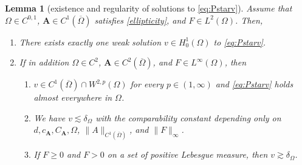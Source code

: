 \documentclass[12pt,a4paper]{amsart}
\newtheorem{lemma}[theorem]{\bf Lemma}
\theoremstyle{definition}
\newcommand{\A}{\mathbf{A}}
\begin{document}
\begin{lemma}[existence and regularity of solutions to \eqref{eq:Pstarv}]\label{lem:linear}
    Assume that $\Omega \in C^{0,1}$, $\A\in C^1(\overline{\Omega})$ satisfies \eqref{ellipticity}, and $F\in L^2(\Omega)$. Then,
    \begin{enumerate} 
        \item \label{lem:linear_i} There exists exactly one weak solution $v\in H^1_0(\Omega)$ to \eqref{eq:Pstarv}.
         \item  \label{lem:linear_ii} If in addition $\Omega \in C^2$, $\A\in C^2(\overline{\Omega})$, and $F\in L^\infty(\Omega)$, then
        \begin{enumerate}[label={\bf \textup{(\alph*)}}]
            \item\label{lem:linear_iia} $v\in C^1(\overline{\Omega})\cap W^{2,p}(\Omega)$ for every $p\in (1,\infty)$ and \eqref{eq:Pstarv} holds almost everywhere in $\Omega$.
            \item\label{lem:linear_iib} We have $v\lesssim \delta_\Omega$ with the comparability constant depending only on $d, c_\A,C_\A,\Omega$, $\|A\|_{C^1(\overline{\Omega})}$, and $\|F\|_\infty$.
            \item\label{lem:linear_iic} If $F\geq 0$ and $F>0$ on a set of positive Lebesgue measure, then $v\gtrsim \delta_\Omega$.
        \end{enumerate}
    \end{enumerate}
\end{lemma}
\end{document}

